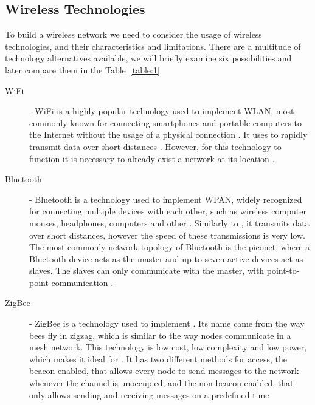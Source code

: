 \subsection{Wireless Technologies}
\label{subsec:wsn_wireless_technologies}
To build a wireless network we need to consider the usage of wireless technologies, and their
characteristics and limitations. There are a multitude of technology alternatives available,
we will briefly examine six possibilities and later compare them in the Table~\ref{table:1}
\begin{description}
      \item[WiFi] - \Gls{WiFi} is a highly popular technology used to implement \Gls{WLAN},
            most commonly
            known for connecting smartphones and portable computers to the Internet without
            the usage of a physical connection \cite{Sidhu2007}. It uses  to
            rapidly transmit data over short distances \cite{Khan2016}. However, for this
            technology to function it is necessary to already exist a 
            network at its location \cite{Nelson2020}.
      \item[Bluetooth] - Bluetooth is a technology used to implement \Gls{WPAN},
            widely recognized for connecting multiple devices with each other,
            such as wireless computer mouses, headphones, computers and other \cite{Wang2021}.
            Similarly to , it transmits data over short distances, however
            the speed of these transmissions is very low. The most commonly network topology
            of Bluetooth is the piconet, where a Bluetooth device acts as the master and up to
            seven active devices act as slaves. The slaves can only communicate with the master,
            with point-to-point communication \cite{Cope2017, Lee2007}.
      \item[ZigBee] - ZigBee is a technology used to implement . Its name
            came from the way bees fly in zigzag, which is similar to
            the way nodes communicate in a mesh network. This technology is low cost, low
            complexity and low power, which makes it ideal for . It has two
            different methods for access, the beacon enabled, that allows every node to send
            messages to the network whenever the channel is unoccupied, and the non beacon
            enabled, that only allows sending and receiving messages on a predefined time

\end{description}
